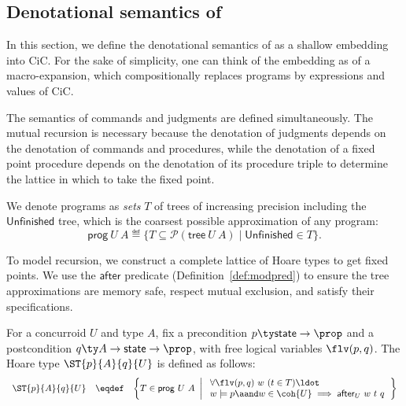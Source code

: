 \subsection{Denotational semantics of \SCST}
\label{sec:denot-sem}

In this section, we define the denotational semantics of \SCST as a
shallow embedding into CiC. For the sake of simplicity, one can think
of the embedding as of a macro-expansion, which compositionally
replaces \SCST programs by expressions and values of CiC.

The semantics of commands and judgments are defined simultaneously.
The mutual recursion is necessary because the denotation of judgments
depends on the denotation of commands and procedures, while the
denotation of a fixed point procedure depends on the denotation of its
procedure triple to determine the lattice in which to take the fixed
point.

We denote \SCST programs as \emph{sets} $T$ of trees of increasing
precision including the $\mathsf{Unfinished}$ tree, which is the coarsest
possible approximation of any program: 
%
\[
\mathsf{prog}~U~A \eqdef \{T
\subseteq \mathcal{P}(\mathsf{tree}~U~A) \mid \mathsf{Unfinished} \in
T\}.
\]

To model recursion, we construct a complete lattice of Hoare types to
get fixed points. We use the $\mathsf{after}$ predicate
(Definition~\ref{def:modpred}) to ensure the tree approximations are
memory safe, respect mutual exclusion, and satisfy their \SCST
specifications. %
 
\begin{definition}
\label{def:htypes}
%
For a concurroid $U$ and type $A$, fix a precondition $p \ty \mathsf{state}
\to \prop$ and a postcondition $q \ty A \to \mathsf{state} \to \prop$, with
free logical variables $\flv(p, q)$. The \SCST Hoare type
$\ST{p}{A}{q}{U}$ is defined as follows:
%
\[
\begin{array}{rcl}
\ST{p}{A}{q}{U} & \eqdef &   
\left\{ 
T \in \mathsf{prog}~U~A ~\left|~
  \begin{array}{l}
    \forall \flv(p,q)~w~(t \in T) \ldot
    \\ 
    w \models p \aand w \in \coh{U} \implies \mathsf{after}_U~w~t~q

  \end{array}
\right.
\right\} 
\end{array}
\]
\end{definition}


